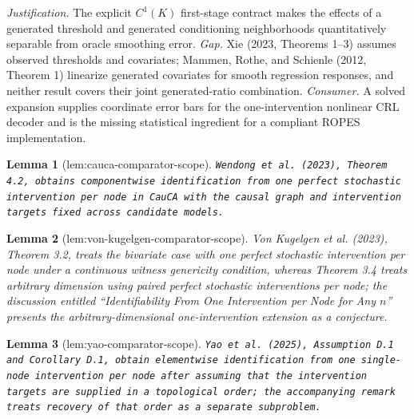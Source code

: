 \documentclass{article}
\newtheorem{lemma}{Lemma}
\begin{document}
\par\smallskip\noindent \textit{Justification.} The explicit \(C^1(K)\) first-stage contract makes the effects of a generated threshold and generated conditioning neighborhoods quantitatively separable from oracle smoothing error. \textit{Gap.} Xie (2023, Theorems 1--3) assumes observed thresholds and covariates; Mammen, Rothe, and Schienle (2012, Theorem 1) linearize generated covariates for smooth regression responses, and neither result covers their joint generated-ratio combination. \textit{Consumer.} A solved expansion supplies coordinate error bars for the one-intervention nonlinear CRL decoder and is the missing statistical ingredient for a compliant ROPES implementation.

\begin{lemma}[lem:cauca-comparator-scope]\label{lem:cauca-comparator-scope}
\texttt{Wendong et al. (2023),\allowbreak{} Theorem 4.2,\allowbreak{} obtains componentwise identification from one perfect stochastic intervention per node in CauCA with the causal graph and intervention targets fixed across candidate models.}
\end{lemma}

\begin{lemma}[lem:von-kugelgen-comparator-scope]\label{lem:von-kugelgen-comparator-scope}
Von Kugelgen et al. (2023), Theorem 3.2, treats the bivariate case with one perfect stochastic intervention per node under a continuous witness genericity condition, whereas Theorem 3.4 treats arbitrary dimension using paired perfect stochastic interventions per node; the discussion entitled ``Identifiability From One Intervention per Node for Any \(n\)'' presents the arbitrary-dimensional one-intervention extension as a conjecture.
\end{lemma}

\begin{lemma}[lem:yao-comparator-scope]\label{lem:yao-comparator-scope}
\texttt{Yao et al. (2025),\allowbreak{} Assumption D.1 and Corollary D.1,\allowbreak{} obtain elementwise identification from one single-\allowbreak{}node intervention per node after assuming that the intervention targets are supplied in a topological order;\allowbreak{} the accompanying remark treats recovery of that order as a separate subproblem.}
\end{lemma}
\end{document}
